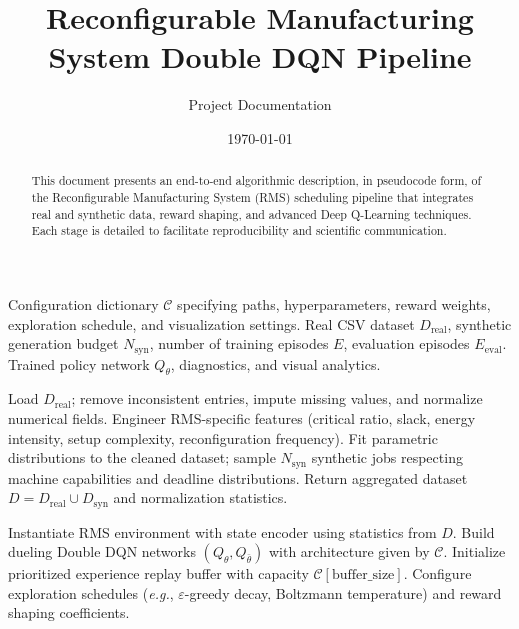 \documentclass{article}
\begin{document}
\title{Reconfigurable Manufacturing System Double DQN Pipeline}
\author{Project Documentation}
\date{\today}
\maketitle

\begin{abstract}
This document presents an end-to-end algorithmic description, in pseudocode form, of the Reconfigurable Manufacturing System (RMS) scheduling pipeline that integrates real and synthetic data, reward shaping, and advanced Deep Q-Learning techniques. Each stage is detailed to facilitate reproducibility and scientific communication.
\end{abstract}

\begin{algorithm}
\caption{RMS Double DQN Training and Evaluation Pipeline}
\begin{algorithmic}[1]
\Require Configuration dictionary $\mathcal{C}$ specifying paths, hyperparameters, reward weights, exploration schedule, and visualization settings.
\Require Real CSV dataset $D_{\text{real}}$, synthetic generation budget $N_{\text{syn}}$, number of training episodes $E$, evaluation episodes $E_{\text{eval}}$.
\Ensure Trained policy network $Q_{\theta}$, diagnostics, and visual analytics.

\Statex
{}
    \State Load $D_{\text{real}}$; remove inconsistent entries, impute missing values, and normalize numerical fields.
    \State Engineer RMS-specific features (critical ratio, slack, energy intensity, setup complexity, reconfiguration frequency).
    \State Fit parametric distributions to the cleaned dataset; sample $N_{\text{syn}}$ synthetic jobs respecting machine capabilities and deadline distributions.
    \State Return aggregated dataset $D = D_{\text{real}} \cup D_{\text{syn}}$ and normalization statistics.
\EndProcedure

\Statex
{}
    \State Instantiate RMS environment with state encoder using statistics from $D$.
    \State Build dueling Double DQN networks $(Q_{\theta}, Q_{\bar{\theta}})$ with architecture given by $\mathcal{C}$.
    \State Initialize prioritized experience replay buffer with capacity $\mathcal{C}[\text{buffer\_size}]$.
    \State Configure exploration schedules (\textit{e.g.}, $\varepsilon$-greedy decay, Boltzmann temperature) and reward shaping coefficients.
\EndProcedure


\end{algorithmic}
\end{algorithm}
\end{document}
